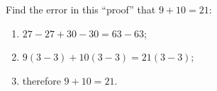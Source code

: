 Find the error in this ``proof'' that $9+10=21$:
\begin{enumerate}
\item $27-27+30-30=63-63$;
\item $9(3-3)+10(3-3)=21(3-3)$;
\item therefore $9+10=21$.
\end{enumerate}
